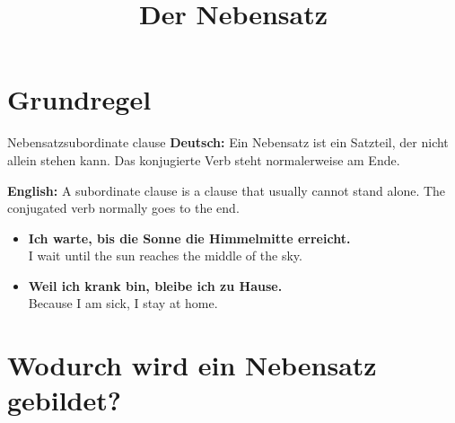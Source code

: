 \documentclass[a4paper,11pt]{article}
\title{Der Nebensatz}
\date{}
\newcommand{\GermanText}[1]{\textbf{Deutsch: }#1\par}
\newcommand{\EnglishText}[1]{{\small\color{SoftGray}\textbf{English: }#1\par}}
\newcommand{\ExampleItem}[2]{\item \textbf{#1}\\{\small\color{SoftGray}#2}}
\begin{document}
    \maketitle
    
    
    \section{Grundregel}
        
        \begin{grammarentry}{Nebensatz}{subordinate clause}
            \GermanText{Ein Nebensatz ist ein Satzteil, der nicht allein stehen kann. Das konjugierte Verb steht normalerweise am Ende.}
            \EnglishText{A subordinate clause is a clause that usually cannot stand alone. The conjugated verb normally goes to the end.}
            
            \begin{exbox}
                \begin{itemize}
                    \ExampleItem{Ich warte, bis die Sonne die Himmelmitte erreicht.}{I wait until the sun reaches the middle of the sky.}
                    \ExampleItem{Weil ich krank bin, bleibe ich zu Hause.}{Because I am sick, I stay at home.}
                \end{itemize}
            \end{exbox}
        \end{grammarentry}
    
    
    \section{Wodurch wird ein Nebensatz gebildet?}
        
\end{document}
